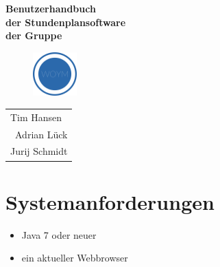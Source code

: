 \documentclass[fontsize=12pt]{scrartcl}
\begin{document}
  \thispagestyle{empty}
  \vspace{3cm}
  \begin{minipage}[H]{\textwidth}
  \begin{center}
  \vspace{1cm}
  \bf
  {\Large Benutzerhandbuch}\\
  der Stundenplansoftware \\
  der Gruppe\\
    \begin{figure}[H]
    \centering
    \includegraphics[width=0.15\textwidth]{../WOYM.png}
    \end{figure}
  \vfill
  \end{center}
  \end{minipage}
  \vfill
  \begin{minipage}[H]{\textwidth}
  \begin{center}
  \sf
  \begin{tabular}{l}
  Tim Hansen \\\
  Adrian Lück \\
  Jurij Schmidt\\
  \end{tabular}
  \end{center}
  \end{minipage}
\restoregeometry

\cleardoubleemptypage

\newpage

  \thispagestyle{fancy}
  \fancyhead{}
  \fancyfoot{}
  \renewcommand{\headrulewidth}{0.4pt}
  \tableofcontents

\newpage

\section{Systemanforderungen}
\begin{itemize}
\item Java 7 oder neuer
\item ein aktueller Webbrowser
\end{itemize}
\end{document}
